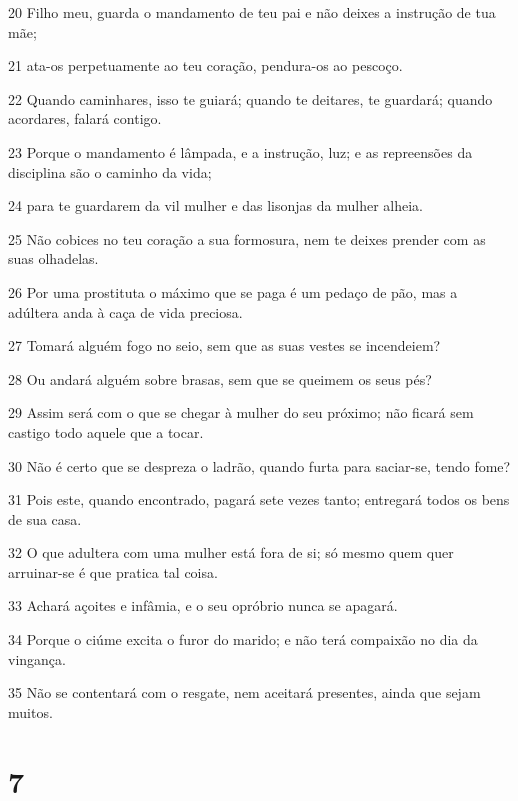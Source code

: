 \par 20 Filho meu, guarda o mandamento de teu pai e não deixes a instrução de tua mãe;
\par 21 ata-os perpetuamente ao teu coração, pendura-os ao pescoço.
\par 22 Quando caminhares, isso te guiará; quando te deitares, te guardará; quando acordares, falará contigo.
\par 23 Porque o mandamento é lâmpada, e a instrução, luz; e as repreensões da disciplina são o caminho da vida;
\par 24 para te guardarem da vil mulher e das lisonjas da mulher alheia.
\par 25 Não cobices no teu coração a sua formosura, nem te deixes prender com as suas olhadelas.
\par 26 Por uma prostituta o máximo que se paga é um pedaço de pão, mas a adúltera anda à caça de vida preciosa.
\par 27 Tomará alguém fogo no seio, sem que as suas vestes se incendeiem?
\par 28 Ou andará alguém sobre brasas, sem que se queimem os seus pés?
\par 29 Assim será com o que se chegar à mulher do seu próximo; não ficará sem castigo todo aquele que a tocar.
\par 30 Não é certo que se despreza o ladrão, quando furta para saciar-se, tendo fome?
\par 31 Pois este, quando encontrado, pagará sete vezes tanto; entregará todos os bens de sua casa.
\par 32 O que adultera com uma mulher está fora de si; só mesmo quem quer arruinar-se é que pratica tal coisa.
\par 33 Achará açoites e infâmia, e o seu opróbrio nunca se apagará.
\par 34 Porque o ciúme excita o furor do marido; e não terá compaixão no dia da vingança.
\par 35 Não se contentará com o resgate, nem aceitará presentes, ainda que sejam muitos.

\chapter{7}

